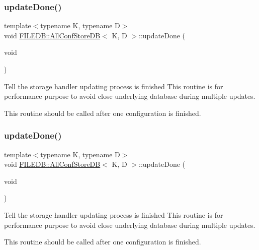 \subsubsection{\texorpdfstring{updateDone()}{updateDone()}\hspace{0.1cm}{\footnotesize\ttfamily [1/3]}}
{\footnotesize\ttfamily template$<$typename K, typename D$>$ \\
void \mbox{\hyperlink{classFILEDB_1_1AllConfStoreDB}{F\+I\+L\+E\+D\+B\+::\+All\+Conf\+Store\+DB}}$<$ K, D $>$\+::update\+Done (\begin{DoxyParamCaption}\item[{void}]{ }\end{DoxyParamCaption})\hspace{0.3cm}{\ttfamily [inline]}}

Tell the storage handler updating process is finished This routine is for performance purpose to avoid close underlying database during multiple updates.

This routine should be called after one configuration is finished. \mbox{\label{classFILEDB_1_1AllConfStoreDB_ac90e596f6c914145130719ec5ac13593}} 
\subsubsection{\texorpdfstring{updateDone()}{updateDone()}\hspace{0.1cm}{\footnotesize\ttfamily [2/3]}}
{\footnotesize\ttfamily template$<$typename K, typename D$>$ \\
void \mbox{\hyperlink{classFILEDB_1_1AllConfStoreDB}{F\+I\+L\+E\+D\+B\+::\+All\+Conf\+Store\+DB}}$<$ K, D $>$\+::update\+Done (\begin{DoxyParamCaption}\item[{void}]{ }\end{DoxyParamCaption})\hspace{0.3cm}{\ttfamily [inline]}}

Tell the storage handler updating process is finished This routine is for performance purpose to avoid close underlying database during multiple updates.

This routine should be called after one configuration is finished. \mbox{\label{classFILEDB_1_1AllConfStoreDB_ac90e596f6c914145130719ec5ac13593}} 

